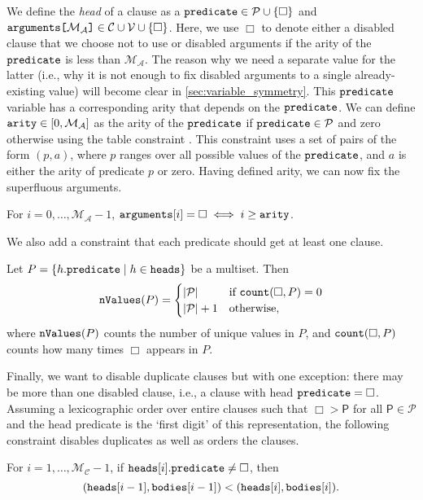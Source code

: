 \documentclass[runningheads]{llncs}
\newcommand{\variable}[1]{\texttt{\textup{#1}}}
\newcommand{\arrayd}[3]{\variable{{#1}[}{#2}\variable{]} \in {#3}}
\newcommand{\predicates}{\mathcal{P}}
\newcommand{\variables}{\mathcal{V}}
\newcommand{\constants}{\mathcal{C}}
\newcommand{\maxArity}{\mathcal{M}_{\mathcal{A}}}
\newcommand{\maxNumClauses}{\mathcal{M}_{\mathcal{C}}}
\begin{document}
We define the \emph{head} of a clause as a $\variable{predicate} \in \predicates{}
\cup \{ \Box \}$ and $\arrayd{arguments}{\maxArity{}}{\constants{} \cup
  \variables{}} \cup \{ \Box \}$. Here, we use $\Box$ to denote either a
disabled clause that we choose not to use or disabled arguments if the arity of
the $\variable{predicate}$ is less than $\maxArity{}$. The reason why we need a
separate value for the latter (i.e., why it is not enough to fix disabled
arguments to a single already-existing value) will become clear in
\cref{sec:variable_symmetry}. This $\variable{predicate}$ variable has a
corresponding arity that depends on the $\variable{predicate}$. We can
define $\variable{arity} \in [0, \maxArity{}]$ as the arity of the
$\variable{predicate}$ if $\variable{predicate} \in \predicates{}$ and zero
otherwise using the table constraint \cite{DBLP:conf/cpaior/MairyDL15}. This
constraint uses a set of pairs of the form $(p, a)$, where $p$ ranges over all
possible values of the $\variable{predicate}$, and $a$ is either the arity of
predicate $p$ or zero. Having defined arity, we can now fix the superfluous
arguments.
\begin{constraint} \label{constr:arity}
  For $i = 0, \dots, \maxArity{} - 1$, $\variable{arguments}[i] = \Box \iff i
  \ge \variable{arity}$.
\end{constraint}
We also add a constraint that each predicate should get at least one clause.
\begin{constraint}
  Let $P = \{ h.\variable{predicate} \mid h \in \variable{heads} \}$ be a
  multiset. Then
  \[
    \variable{nValues}(P) = \begin{cases}
      |\predicates{}| & \text{if } \variable{count}(\Box, P) = 0 \\
      |\predicates{}| + 1 & \text{otherwise,}
    \end{cases}
  \]
  where $\variable{nValues}(P)$ counts the number of unique values in $P$, and
  $\variable{count}(\Box, P)$ counts how many times $\Box$ appears in $P$.
\end{constraint}
Finally, we want to disable duplicate clauses but with one exception: there may
be more than one disabled clause, i.e., a clause with head $\variable{predicate}
= \Box$. Assuming a lexicographic order over entire clauses such that $\Box >
\mathsf{P}$ for all $\mathsf{P} \in \predicates{}$ and the head predicate is the
`first digit' of this representation, the following constraint disables
duplicates as well as orders the clauses.
\begin{constraint}
  For $i = 1, \dots, \maxNumClauses{} - 1$, if $\variable{heads}[i].\variable{predicate}
  \ne \Box$, then
  \[
    (\variable{heads}[i-1], \variable{bodies}[i-1]) < (\variable{heads}[i],
    \variable{bodies}[i]).
  \]
\end{constraint}
\end{document}
